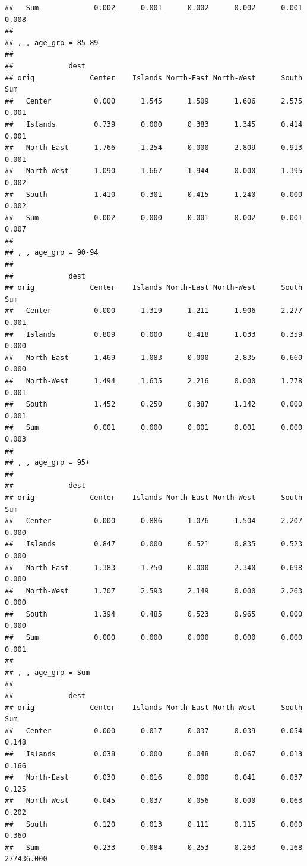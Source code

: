 \documentclass[
]{book}
\begin{document}
\begin{verbatim}
##   Sum             0.002      0.001      0.002      0.002      0.001      0.008
## 
## , , age_grp = 85-89
## 
##             dest
## orig             Center    Islands North-East North-West      South        Sum
##   Center          0.000      1.545      1.509      1.606      2.575      0.001
##   Islands         0.739      0.000      0.383      1.345      0.414      0.001
##   North-East      1.766      1.254      0.000      2.809      0.913      0.001
##   North-West      1.090      1.667      1.944      0.000      1.395      0.002
##   South           1.410      0.301      0.415      1.240      0.000      0.002
##   Sum             0.002      0.000      0.001      0.002      0.001      0.007
## 
## , , age_grp = 90-94
## 
##             dest
## orig             Center    Islands North-East North-West      South        Sum
##   Center          0.000      1.319      1.211      1.906      2.277      0.001
##   Islands         0.809      0.000      0.418      1.033      0.359      0.000
##   North-East      1.469      1.083      0.000      2.835      0.660      0.000
##   North-West      1.494      1.635      2.216      0.000      1.778      0.001
##   South           1.452      0.250      0.387      1.142      0.000      0.001
##   Sum             0.001      0.000      0.001      0.001      0.000      0.003
## 
## , , age_grp = 95+
## 
##             dest
## orig             Center    Islands North-East North-West      South        Sum
##   Center          0.000      0.886      1.076      1.504      2.207      0.000
##   Islands         0.847      0.000      0.521      0.835      0.523      0.000
##   North-East      1.383      1.750      0.000      2.340      0.698      0.000
##   North-West      1.707      2.593      2.149      0.000      2.263      0.000
##   South           1.394      0.485      0.523      0.965      0.000      0.000
##   Sum             0.000      0.000      0.000      0.000      0.000      0.001
## 
## , , age_grp = Sum
## 
##             dest
## orig             Center    Islands North-East North-West      South        Sum
##   Center          0.000      0.017      0.037      0.039      0.054      0.148
##   Islands         0.038      0.000      0.048      0.067      0.013      0.166
##   North-East      0.030      0.016      0.000      0.041      0.037      0.125
##   North-West      0.045      0.037      0.056      0.000      0.063      0.202
##   South           0.120      0.013      0.111      0.115      0.000      0.360
##   Sum             0.233      0.084      0.253      0.263      0.168 277436.000
\end{verbatim}
\end{document}
